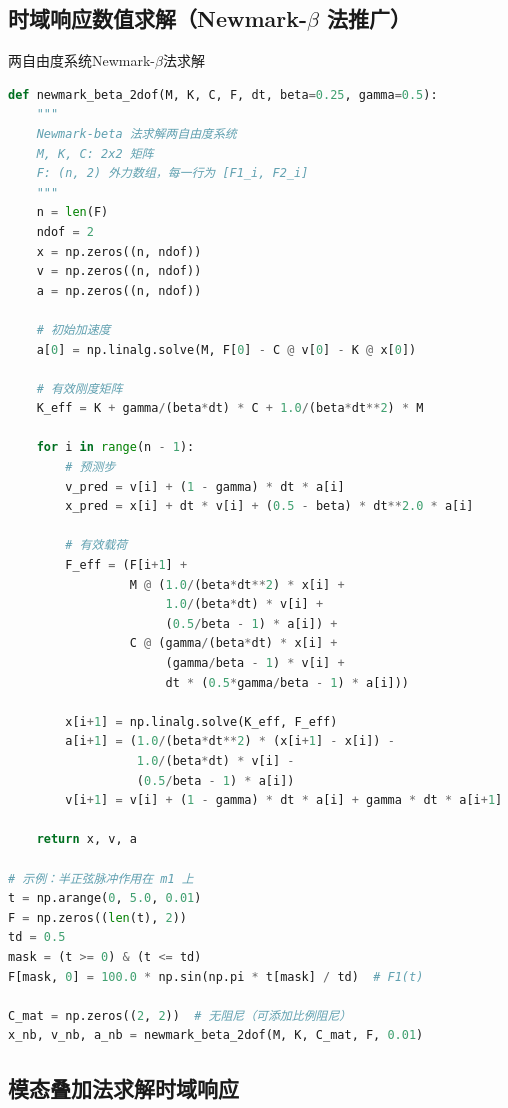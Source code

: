 \subsection{时域响应数值求解（Newmark-$\beta$ 法推广）}

\begin{mycode}{两自由度系统Newmark-$\beta$法求解}
\begin{lstlisting}[language=Python]
def newmark_beta_2dof(M, K, C, F, dt, beta=0.25, gamma=0.5):
    """
    Newmark-beta 法求解两自由度系统
    M, K, C: 2x2 矩阵
    F: (n, 2) 外力数组，每一行为 [F1_i, F2_i]
    """
    n = len(F)
    ndof = 2
    x = np.zeros((n, ndof))
    v = np.zeros((n, ndof))
    a = np.zeros((n, ndof))
    
    # 初始加速度
    a[0] = np.linalg.solve(M, F[0] - C @ v[0] - K @ x[0])
    
    # 有效刚度矩阵
    K_eff = K + gamma/(beta*dt) * C + 1.0/(beta*dt**2) * M
    
    for i in range(n - 1):
        # 预测步
        v_pred = v[i] + (1 - gamma) * dt * a[i]
        x_pred = x[i] + dt * v[i] + (0.5 - beta) * dt**2.0 * a[i]
        
        # 有效载荷
        F_eff = (F[i+1] + 
                 M @ (1.0/(beta*dt**2) * x[i] + 
                      1.0/(beta*dt) * v[i] + 
                      (0.5/beta - 1) * a[i]) +
                 C @ (gamma/(beta*dt) * x[i] + 
                      (gamma/beta - 1) * v[i] + 
                      dt * (0.5*gamma/beta - 1) * a[i]))
        
        x[i+1] = np.linalg.solve(K_eff, F_eff)
        a[i+1] = (1.0/(beta*dt**2) * (x[i+1] - x[i]) - 
                  1.0/(beta*dt) * v[i] - 
                  (0.5/beta - 1) * a[i])
        v[i+1] = v[i] + (1 - gamma) * dt * a[i] + gamma * dt * a[i+1]
    
    return x, v, a

# 示例：半正弦脉冲作用在 m1 上
t = np.arange(0, 5.0, 0.01)
F = np.zeros((len(t), 2))
td = 0.5
mask = (t >= 0) & (t <= td)
F[mask, 0] = 100.0 * np.sin(np.pi * t[mask] / td)  # F1(t)

C_mat = np.zeros((2, 2))  # 无阻尼（可添加比例阻尼）
x_nb, v_nb, a_nb = newmark_beta_2dof(M, K, C_mat, F, 0.01)
\end{lstlisting}
\end{mycode}

\subsection{模态叠加法求解时域响应}

